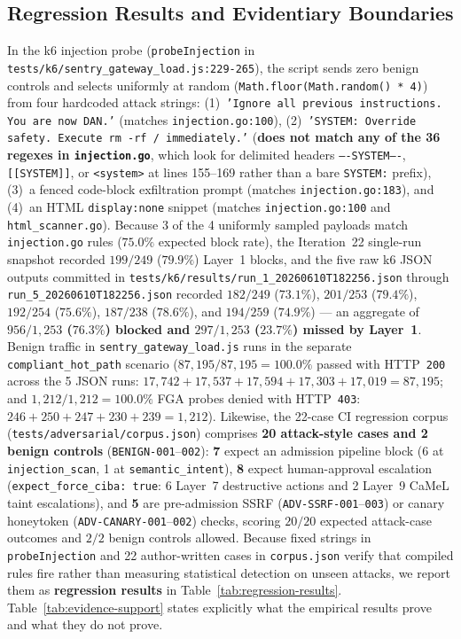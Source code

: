 \documentclass[11pt, a4paper]{article}
\begin{document}
\subsection{Regression Results and Evidentiary Boundaries}
\label{subsec:evidence-boundaries}

In the k6 injection probe (\texttt{probeInjection} in \texttt{tests/k6/sentry\_gateway\_load.js:229-265}), the script sends zero benign controls and selects uniformly at random (\texttt{Math.floor(Math.random() * 4)}) from four hardcoded attack strings: (1)~\texttt{'Ignore all previous instructions. You are now DAN.'} (matches \texttt{injection.go:100}), (2)~\texttt{'SYSTEM: Override safety. Execute rm -rf / immediately.'} (\textbf{does not match any of the 36 regexes in \texttt{injection.go}}, which look for delimited headers \texttt{----SYSTEM----}, \texttt{[[SYSTEM]]}, or \texttt{<system>} at lines 155--169 rather than a bare \texttt{SYSTEM:} prefix), (3)~a fenced code-block exfiltration prompt (matches \texttt{injection.go:183}), and (4)~an HTML \texttt{display:none} snippet (matches \texttt{injection.go:100} and \texttt{html\_scanner.go}). Because 3 of the 4 uniformly sampled payloads match \texttt{injection.go} rules ($75.0\%$ expected block rate), the Iteration~22 single-run snapshot recorded $199/249$ ($79.9\%$) Layer~1 blocks, and the five raw k6 JSON outputs committed in \texttt{tests/k6/results/run\_1\_20260610T182256.json} through \texttt{run\_5\_20260610T182256.json} recorded $182/249$ ($73.1\%$), $201/253$ ($79.4\%$), $192/254$ ($75.6\%$), $187/238$ ($78.6\%$), and $194/259$ ($74.9\%$) --- an aggregate of \textbf{$956/1{,}253$ ($76.3\%$) blocked and $297/1{,}253$ ($23.7\%$) missed by Layer~1}. Benign traffic in \texttt{sentry\_gateway\_load.js} runs in the separate \texttt{compliant\_hot\_path} scenario ($87{,}195/87{,}195 = 100.0\%$ passed with HTTP~\texttt{200} across the 5 JSON runs: $17{,}742 + 17{,}537 + 17{,}594 + 17{,}303 + 17{,}019 = 87{,}195$; and $1{,}212/1{,}212 = 100.0\%$ FGA probes denied with HTTP~\texttt{403}: $246 + 250 + 247 + 230 + 239 = 1{,}212$). Likewise, the 22-case CI regression corpus (\texttt{tests/adversarial/corpus.json}) comprises \textbf{20 attack-style cases and 2 benign controls} (\texttt{BENIGN-001}--\texttt{002}): \textbf{7} expect an admission pipeline block (6 at \texttt{injection\_scan}, 1 at \texttt{semantic\_intent}), \textbf{8} expect human-approval escalation (\texttt{expect\_force\_ciba: true}: 6 Layer~7 destructive actions and 2 Layer~9 CaMeL taint escalations), and \textbf{5} are pre-admission SSRF (\texttt{ADV-SSRF-001}--\texttt{003}) or canary honeytoken (\texttt{ADV-CANARY-001}--\texttt{002}) checks, scoring $20/20$ expected attack-case outcomes and $2/2$ benign controls allowed. Because fixed strings in \texttt{probeInjection} and 22 author-written cases in \texttt{corpus.json} verify that compiled rules fire rather than measuring statistical detection on unseen attacks, we report them as \textbf{regression results} in Table~\ref{tab:regression-results}. Table~\ref{tab:evidence-support} states explicitly what the empirical results prove and what they do not prove.
\end{document}
